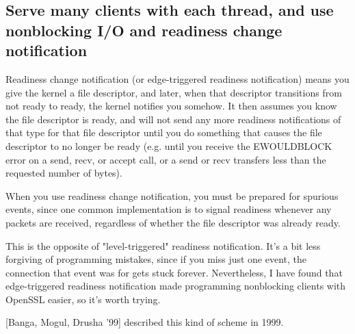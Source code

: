 \documentclass[12pt, twoside, a4paper, xetex]{report}
\begin{document}
\subsection*{Serve many clients with each thread, and use nonblocking I/O and readiness change notification}

Readiness change notification (or edge-triggered readiness notification) means you give the kernel a file descriptor, and later, when that descriptor transitions from not ready to ready, the kernel notifies you somehow. It then assumes you know the file descriptor is ready, and will not send any more readiness notifications of that type for that file descriptor until you do something that causes the file descriptor to no longer be ready (e.g. until you receive the EWOULDBLOCK error on a send, recv, or accept call, or a send or recv transfers less than the requested number of bytes).

When you use readiness change notification, you must be prepared for spurious events, since one common implementation is to signal readiness whenever any packets are received, regardless of whether the file descriptor was already ready.

This is the opposite of "level-triggered" readiness notification. It's a bit less forgiving of programming mistakes, since if you miss just one event, the connection that event was for gets stuck forever. Nevertheless, I have found that edge-triggered readiness notification made programming nonblocking clients with OpenSSL easier, so it's worth trying.

[Banga, Mogul, Drusha '99] described this kind of scheme in 1999.
\end{document}
